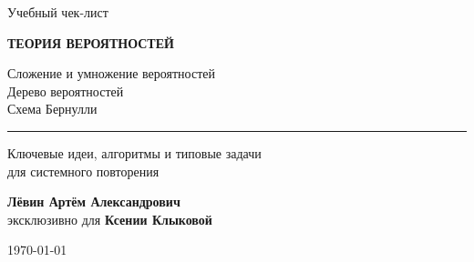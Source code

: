 \documentclass[a4paper,12pt]{article}
\begin{document}

\begin{titlepage}
\thispagestyle{empty}

\begin{center}

\vspace*{2.1cm}

{\Large\color{softgray}Учебный чек-лист}

\vspace{1cm}

{\fontsize{27}{32}\selectfont\bfseries\color{darkaccent}
ТЕОРИЯ ВЕРОЯТНОСТЕЙ}

\vspace{0.45cm}

{\Large
Сложение и умножение вероятностей\\
Дерево вероятностей\\
Схема Бернулли}

\vspace{1.2cm}

{\color{accent}\rule{0.68\linewidth}{1pt}}

\vspace{1.3cm}

{\large
Ключевые идеи, алгоритмы и типовые задачи\\
для системного повторения}

\vfill

{\large
\textbf{Лёвин Артём Александрович}\\[0.25cm]
эксклюзивно для \textbf{Ксении Клыковой}
}

\vspace{0.7cm}

{\large \today}

\vspace{1.8cm}


\vspace{0.4cm}

\end{center}
\end{titlepage}
\end{document}
